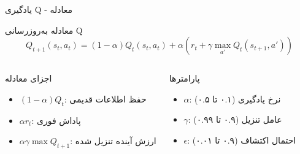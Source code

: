 \documentclass[aspectratio=169]{beamer}
\begin{document}
\begin{frame}{یادگیری Q - معادله}
\begin{block}{معادله به‌روزرسانی Q}
\begin{equation*}
Q_{t+1}(s_t, a_t) = (1 - \alpha) Q_t(s_t, a_t) + \alpha(r_t + \gamma \max_{a'} Q_t(s_{t+1}, a'))
\end{equation*}
\end{block}

\begin{columns}
\begin{block}{اجزای معادله}
\begin{itemize}
\item $(1-\alpha)Q_t$: حفظ اطلاعات قدیمی
\item $\alpha r_t$: پاداش فوری
\item $\alpha\gamma\max Q_{t+1}$: ارزش آینده تنزیل شده
\end{itemize}
\end{block}

\begin{block}{پارامترها}
\begin{itemize}
\item $\alpha$: نرخ یادگیری (۰.۱ تا ۰.۵)
\item $\gamma$: عامل تنزیل (۰.۹ تا ۰.۹۹)
\item $\epsilon$: احتمال اکتشاف (۰.۹ تا ۰.۰۱)
\end{itemize}
\end{block}
\end{columns}
\end{frame}
\end{document}
